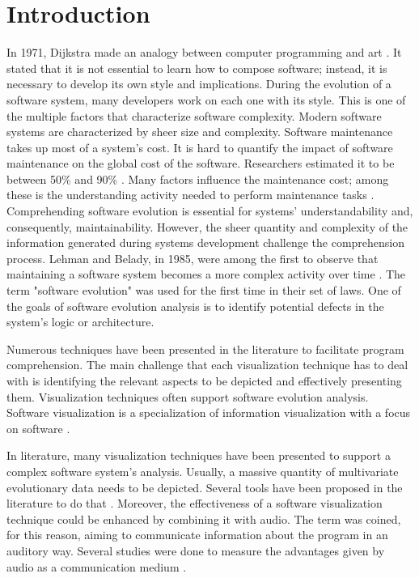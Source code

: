 \chapter{Introduction}

In 1971, Dijkstra made an analogy between computer programming and art \cite{Dijkstra1971a}.
It stated that it is not essential to learn how to compose software; instead, it is necessary to develop its own style and implications. 
During the evolution of a software system, many developers work on each one with its style.
 This is one of the multiple factors that characterize software complexity. 
Modern software systems are characterized by sheer size and complexity. Software maintenance takes up most of a system's cost. It is hard to quantify the impact of software maintenance on the global cost of the software. 
Researchers estimated it to be between 50\% and 90\% \cite{Davis1995} \cite{Sommerville1995}\cite{Erlikh2000} \cite{seacord2003}. Many factors influence the maintenance cost; among these is the understanding activity needed to perform maintenance tasks \cite{Corbi1989}. Comprehending software evolution is essential for systems' understandability and, consequently, maintainability. However, the sheer quantity and complexity of the information generated during systems development challenge the comprehension process. Lehman and Belady, in 1985, were among the first to observe that maintaining a software system becomes a more complex activity over time \cite{Lehman1985}. The term "software evolution" was used for the first time in their set of laws.  One of the goals of software evolution analysis is to identify potential defects in the system's logic or architecture. 

Numerous techniques have been presented in the literature to facilitate program comprehension. The main challenge that each visualization technique has to deal with is identifying the relevant aspects to be depicted and effectively presenting them. Visualization techniques often support software evolution analysis. Software visualization is a specialization of information visualization with a focus on software \cite{Lanza2003}. 

In literature, many visualization techniques have been presented to support a complex software system's analysis. Usually, a massive quantity of multivariate evolutionary data needs to be depicted. Several tools have been proposed in the literature to do that \cite{Merino2018a}. Moreover, the effectiveness of a software visualization technique could be enhanced by combining it with audio. The term  was coined, for this reason, aiming to communicate information about the program in an auditory way.
Several studies were done to measure the advantages given by audio as a communication medium \cite{Alty1995}.

